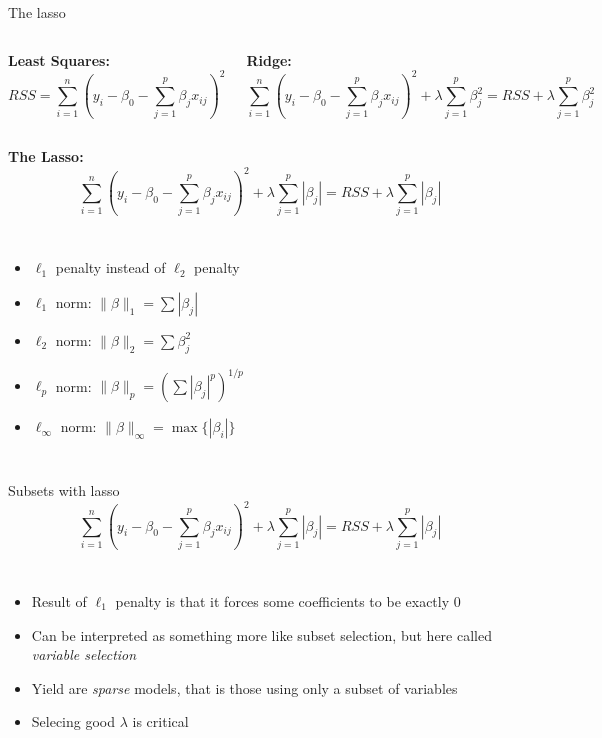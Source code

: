 \documentclass[aspectratio=169,usenames,dvipsnames]{beamer}
\newcommand{\InstructorList}[1]{
\begin{itemize}
	\color{orange}
	#1
\end{itemize}
}
\begin{document}
\begin{frame}[t]{The lasso}

\begin{columns}
\centering
\textbf{Least Squares:}
\footnotesize
\begin{equation*}
	RSS = \sum_{i=1}^n \left(y_i - \beta_0 - \sum_{j=1}^p \beta_j x_{ij}\right)^2
\end{equation*}

\centering
\footnotesize
\textbf{Ridge:}
\begin{equation*}
	\sum_{i=1}^n \left(y_i - \beta_0 - \sum_{j=1}^p \beta_j x_{ij}\right)^2 + \lambda \sum_{j=1}^p \beta_j^2 = RSS + \lambda \sum_{j=1}^p \beta_j^2
\end{equation*}

\end{columns}
\centering
\qquad

\textbf{The Lasso:}
\begin{equation*}
	\sum_{i=1}^n \left(y_i - \beta_0 - \sum_{j=1}^p \beta_j x_{ij}\right)^2
		+ \lambda \sum_{j=1}^p |\beta_j|
	= RSS + \lambda \sum_{j=1}^p |\beta_j|
\end{equation*}

\begin{columns}
\centering
\footnotesize
\InstructorList{
\item $\ell_1$ penalty instead of $\ell_2$ penalty
\item $\ell_1$ norm: $\|\beta \|_1 = \sum |\beta_j|$
\item $\ell_2$ norm: $\|\beta \|_2 = \sum \beta_j^2$
\item $\ell_p$ norm: $\|\beta\|_p = (\sum |\beta_j|^p)^{1/p}$
\item $\ell_\infty$ norm: $\|\beta\|_\infty = \max \{|\beta_i|\}$
}
\centering

\footnotesize

\end{columns}

\end{frame}
\begin{frame}[t]{Subsets with lasso}
	\begin{equation*}
		\sum_{i=1}^n \left(y_i - \beta_0 - \sum_{j=1}^p \beta_j x_{ij}\right)^2
			+ \lambda \sum_{j=1}^p |\beta_j|
		= RSS + \lambda \sum_{j=1}^p |\beta_j|
	\end{equation*}
\begin{columns}
\centering
\InstructorList{
\item Result of $\ell_1$ penalty is that it forces some coefficients to be exactly 0
\item Can be interpreted as something more like subset selection, but here called \textit{variable selection}
\item Yield are \textit{sparse} models, that is those using only a subset of variables
\item Selecing good $\lambda$ is critical
}
\centering

\end{columns}

\end{frame}
\end{document}
